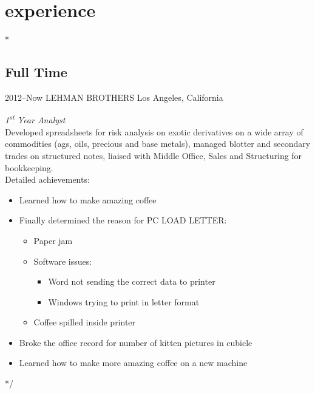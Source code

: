 \documentclass[]{friggeri-cv} %
\begin{document}

\section{experience}

\/*

\subsection{Full Time}

\begin{entrylist}

	\entry
	{2012--Now}
	{LEHMAN BROTHERS}
	{Los Angeles, California}
	{\emph{1\textsuperscript{st} Year Analyst} \\
		Developed spreadsheets for risk analysis on exotic derivatives on a wide array of commodities (ags, oils, precious and base metals), managed blotter and secondary trades on structured notes, liaised with Middle Office, Sales and Structuring for bookkeeping. \\
		Detailed achievements:
		\begin{itemize}
			\item Learned how to make amazing coffee
			\item Finally determined the reason for \textsc{PC LOAD LETTER}:
				\begin{itemize}
					\item Paper jam
					\item Software issues:
						\begin{itemize}
							\item Word not sending the correct data to printer
							\item Windows trying to print in letter format
						\end{itemize}
					\item Coffee spilled inside printer
				\end{itemize}
			\item Broke the office record for number of kitten pictures in cubicle
			\item Learned how to make more amazing coffee on a new machine
		\end{itemize}}

\end{entrylist}
*/
\end{document}
